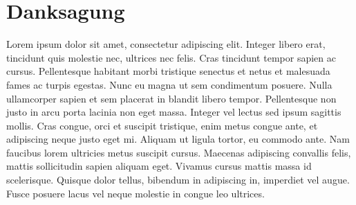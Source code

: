 
\section*{Danksagung}

Lorem ipsum dolor sit amet, consectetur adipiscing elit. Integer libero erat, tincidunt quis molestie nec, ultrices nec felis. Cras tincidunt tempor sapien ac cursus. Pellentesque habitant morbi tristique senectus et netus et malesuada fames ac turpis egestas. Nunc eu magna ut sem condimentum posuere. Nulla ullamcorper sapien et sem placerat in blandit libero tempor. Pellentesque non justo in arcu porta lacinia non eget massa. Integer vel lectus sed ipsum sagittis mollis. Cras congue, orci et suscipit tristique, enim metus congue ante, et adipiscing neque justo eget mi. Aliquam ut ligula tortor, eu commodo ante. Nam faucibus lorem ultricies metus suscipit cursus. Maecenas adipiscing convallis felis, mattis sollicitudin sapien aliquam eget. Vivamus cursus mattis massa id scelerisque. Quisque dolor tellus, bibendum in adipiscing in, imperdiet vel augue. Fusce posuere lacus vel neque molestie in congue leo ultrices.
